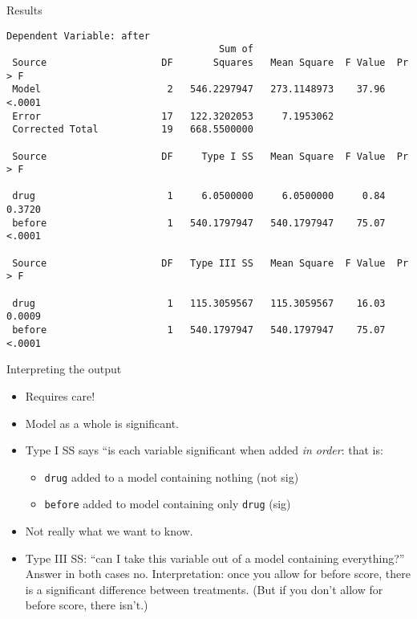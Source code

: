 \documentclass[pdf]{prosper}
\begin{document}
\begin{slide}{Results}

{\scriptsize
\begin{verbatim}
Dependent Variable: after   
                                     Sum of
 Source                    DF       Squares   Mean Square  F Value  Pr > F
 Model                      2   546.2297947   273.1148973    37.96  <.0001
 Error                     17   122.3202053     7.1953062                 
 Corrected Total           19   668.5500000                               

 Source                    DF     Type I SS   Mean Square  F Value  Pr > F

 drug                       1     6.0500000     6.0500000     0.84  0.3720
 before                     1   540.1797947   540.1797947    75.07  <.0001

 Source                    DF   Type III SS   Mean Square  F Value  Pr > F

 drug                       1   115.3059567   115.3059567    16.03  0.0009
 before                     1   540.1797947   540.1797947    75.07  <.0001

\end{verbatim}
}
  
\end{slide}

\begin{slide}{Interpreting the output}

  \begin{itemize}
  \item Requires care!
  \item Model as a whole is significant.
  \item Type I SS says ``is each variable significant when added {\em in order}: that is:
    \begin{itemize}
    \item \verb-drug- added to a model containing nothing (not sig)
    \item \verb-before- added to model containing only \verb-drug- (sig)
    \end{itemize}
  \item Not really what we want to know.
  \item Type III SS: ``can I take this variable out of a model
    containing everything?'' Answer in both cases no. Interpretation:
    once you allow for before score, there is a significant difference
    between treatments. (But if you don't allow for before score, there
    isn't.)
  \end{itemize}
  
\end{slide}
\end{document}

